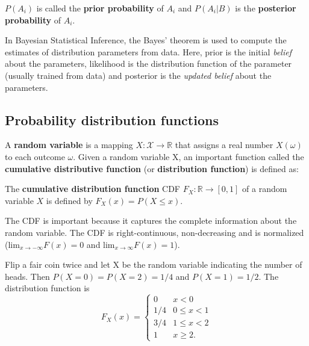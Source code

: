 \begin{remark}
$P(A_{i})$ is called the {\bf prior probability} of $A_i$ and $P(A_{i}|B)$ is the {\bf posterior probability} of $A_i$.
\end{remark}

\begin{remark}
In Bayesian Statistical Inference, the Bayes' theorem is used to compute the estimates of distribution parameters from data. Here, prior is the initial {\em belief} about the parameters, likelihood is the distribution function of the parameter (usually trained from data) and posterior is the {\em updated belief} about the parameters.
\end{remark}

\subsection{Probability distribution functions}

A {\bf random variable} is a mapping $X:\mathcal{X} \rightarrow \mathbb{R}$ that assigns a real number $X(\omega)$ to each outcome $\omega$. Given a random variable X, an important function called the {\bf cumulative distributive function} (or {\bf distribution function}) is defined as:

\begin{definition}
The {\bf cumulative distribution function} CDF $F_{X}: \mathbb{R} \rightarrow [0,1]$ of a random variable $X$ is defined by $F_X(x) = P(X \leq x)$.
\end{definition}

The CDF is important because it captures the complete information about the random variable. The CDF is right-continuous, non-decreasing and is normalized (lim$_{x\rightarrow -\infty} F(x) = 0$ and lim$_{x\rightarrow \infty} F(x)=1$).


\begin{example} 
  Flip a fair coin twice and let X be the random variable indicating the number of heads. Then $P(X=0)=P(X=2)= 1/4$ and $P(X=1)=1/2$. The distribution function is 
\begin{equation*}
F_{X}(x)=\left\{\begin{array}{cc}
0 & x<0\\
1/4 & 0 \leq x < 1 \\
3/4 & 1 \leq x < 2 \\
1 & x \geq 2.
\end{array}\right.
\end{equation*}
\end{example}

